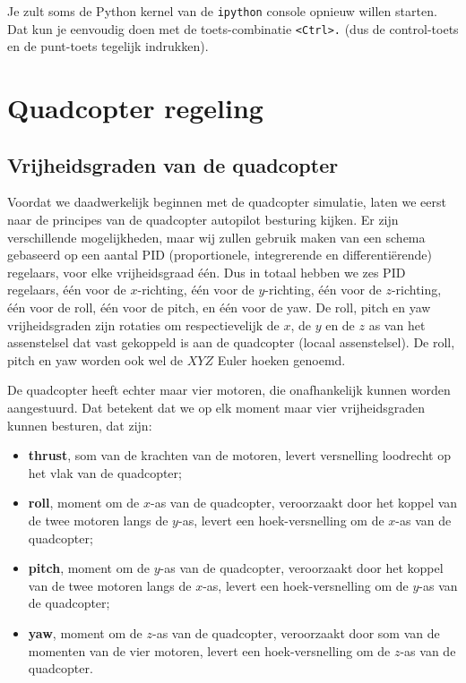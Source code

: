 \documentclass[a4paper,11pt]{article}
\begin{document}
Je zult soms de Python kernel van de  \texttt{ipython} console opnieuw willen starten. Dat kun je eenvoudig doen met de toets-combinatie \texttt{<Ctrl>.} (dus de control-toets en de punt-toets tegelijk indrukken).

\section{Quadcopter regeling}
\label{sec:regeling}

\subsection{Vrijheidsgraden van de quadcopter}
Voordat we daadwerkelijk beginnen met de quadcopter simulatie, laten we eerst naar de principes van de quadcopter autopilot besturing kijken. Er zijn verschillende mogelijkheden, maar wij zullen gebruik maken van een schema gebaseerd op een aantal PID (proportionele, integrerende en differenti\"erende) regelaars, voor elke vrijheidsgraad \'e\'en. Dus in totaal hebben we zes PID regelaars, \'e\'en voor de $x$-richting, \'e\'en voor de $y$-richting, 
\'e\'en voor de $z$-richting, \'e\'en voor de roll, \'e\'en voor de pitch, en \'e\'en voor de yaw.  De roll, pitch en yaw vrijheidsgraden zijn rotaties om respectievelijk de $x$, de $y$ en de $z$ as van het assenstelsel dat vast gekoppeld is aan de quadcopter (locaal assenstelsel). De roll, pitch en yaw worden ook wel de $XYZ$ Euler hoeken genoemd.

De quadcopter heeft echter maar vier motoren, die onafhankelijk kunnen worden aangestuurd. Dat betekent dat we op elk moment maar vier vrijheidsgraden kunnen besturen, dat zijn:
\begin{itemize}
\item \textbf{thrust}, som van de krachten van de motoren, levert versnelling loodrecht op het vlak van de quadcopter;
\item \textbf{roll}, moment om de $x$-as van de quadcopter, veroorzaakt door het koppel van de twee motoren langs de $y$-as, levert een hoek-versnelling om de $x$-as van de quadcopter;
\item \textbf{pitch}, moment om de $y$-as van de quadcopter, veroorzaakt door het koppel van de twee motoren langs de $x$-as, levert een hoek-versnelling om de $y$-as van de quadcopter;
\item \textbf{yaw}, moment om de $z$-as van de quadcopter, veroorzaakt door som van de momenten van de vier motoren, levert een hoek-versnelling om de $z$-as van de quadcopter.
\end{itemize}
\end{document}
